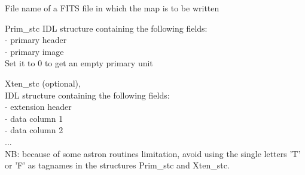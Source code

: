 \begin{qualifiers}
  \begin{qulist}{} %
 	\item[{File}] 
          name of a FITS file in which the map is to be written

 	\item[{Prim\_stc}] 
	IDL structure containing the following fields: \\
		- primary header \\
		- primary image \\
	Set it to 0 to get an empty primary unit

       \item[{Xten\_stc}]
		  (optional), \\
	IDL structure containing the following fields: \\
		- extension header  \\
		- data column 1  \\
		- data column 2   \\
		... \\
	NB: because of some astron routines limitation, avoid using the single letters
		  'T' or 'F' as tagnames in the structures Prim\_stc and Xten\_stc.

  \end{qulist}
\end{qualifiers}

